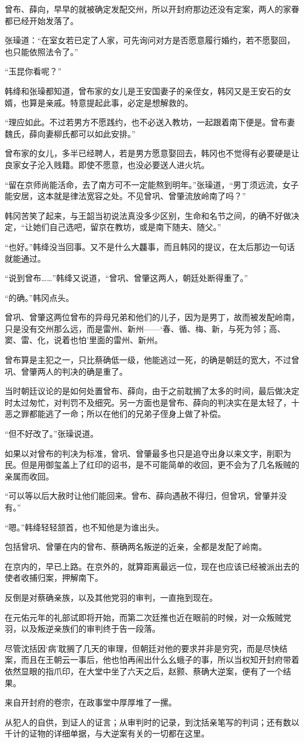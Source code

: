 曾布、薛向，早早的就被确定发配交州，所以开封府那边还没有定案，两人的家眷都已经开始发落了。

张璪道：“在室女若已定了人家，可先询问对方是否愿意履行婚约，若不愿娶回，也只能依照法令了。”

“玉昆你看呢？”

韩绛和张璪都知道，曾布家的女儿是王安国妻子的亲侄女，韩冈又是王安石的女婿，也算是亲戚。特意提起此事，必定是想解救的。

“理应如此。不过若男方不愿践约，也不必送入教坊，一起跟着南下便是。曾布妻魏氏，薛向妻柳氏都可以如此安排。”

曾布家的女儿，多半已经聘人，若是男方愿意娶回去，韩冈也不觉得有必要硬是让良家女子沦入贱籍。即使不愿意，也没必要送人进火坑。

“留在京师尚能活命，去了南方可不一定能熬到明年。”张璪道，“男丁须远流，女子能安居，这本就是律法宽容之处。不见曾巩、曾肇流放岭南了吗？”

韩冈苦笑了起来，与王韶当初说法真没多少区别，生命和名节之间，的确不好做决定，“让她们自己选吧，留京在教坊，或是南下随夫、随父。”

“也好。”韩绛没当回事。又不是什么大龘事，而且韩冈的提议，在太后那边一句话就能通过。

“说到曾布……”韩绛又说道，“曾巩、曾肇这两人，朝廷处断得重了。”

“的确。”韩冈点头。

曾巩、曾肇这两位曾布的异母兄弟和他们的儿子，因为是男丁，故而被发配岭南，只是没有交州那么远，而是雷州、新州——‘春、循、梅、新，与死为邻；高、窦、雷、化，说着也怕’里面的雷州、新州。

曾布算是主犯之一，只比蔡确低一级，他能逃过一死，的确是朝廷的宽大，不过曾巩、曾肇两人的判决的确是重了。

当时朝廷议论的是如何处置曾布、薛向，由于之前耽搁了太多的时间，最后做决定时太过匆忙，对判罚不及细究。另一方面也是曾布、薛向的判决实在是太轻了，十恶之罪都能逃了一命；所以在他们的兄弟子侄身上做了补偿。

“但不好改了。”张璪说道。

如果以对曾布的判决为标准，曾巩、曾肇最多也只是追夺出身以来文字，削职为民。但是用御玺盖上了红印的诏书，是不可能简单的收回，更不会为了几名叛贼的亲属而收回。

“可以等以后大赦时让他们能回来。曾布、薛向遇赦不得归，但曾巩，曾肇并没有。”

“嗯。”韩绛轻轻颔首，也不知他是为谁出头。

包括曾巩、曾肇在内的曾布、蔡确两名叛逆的近亲，全都是发配了岭南。

在京内的，早已上路。在京外的，就算距离最远一位，现在也应该已经被派出去的使者收捕归案，押解南下。

反倒是对蔡确亲族，以及其他党羽的审判，一直拖到现在。

在元佑元年的礼部试即将开始，而第二次廷推也近在眼前的时候，对一众叛贼党羽，以及叛逆亲族们的审判终于告一段落。

尽管沈括因‘病’耽搁了几天的审理，但朝廷对他的要求并非是穷究，而是尽快结案，而且在王朝云一事后，他也怕再闹出什么幺蛾子的事，所以当权知开封府带着依然显眼的指爪印，在大堂中坐了六天之后，赵颢、蔡确大逆案，便有了一个结果。

来自开封府的卷宗，在政事堂中厚厚堆了一摞。

从犯人的自供，到证人的证言；从审判时的记录，到沈括亲笔写的判词；还有数以千计的证物的详细单据，与大逆案有关的一切都在这里。
